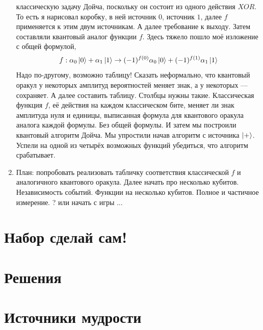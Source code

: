 \documentclass[12pt]{article}
\newcounter{problem}[section]
\theoremstyle{definition}
\begin{document}
\begin{enumerate}
  классическую задачу Дойча, поскольку он состоит из одного действия $XOR$. То есть
  я нарисовал коробку, в ней источник $0$, источник $1$, далее $f$ применяется к
  этим двум источникам. А далее требование к выходу. Затем составляли квантовый
  аналог функции $f$. Здесь тяжело пошло моё изложение с общей формулой,
  \[
   f : \alpha_0 \ket{0} + \alpha_1 \ket{1} \to
   (-1)^{f(0)}\alpha_0 \ket{0} + (-1)^{f(1)}\alpha_1 \ket{1}
  \]
  Надо по-другому, возможно таблицу! Сказать неформально, что квантовый оракул
  у некоторых амплитуд вероятностей меняет знак, а у некоторых — сохраняет.
  А далее составить таблицу. Столбцы нужны такие. Классическая функция $f$,
  её действия на каждом классическом бите, меняет ли знак амплитуда нуля и единицы,
  выписанная формула для квантового оракула аналога каждой формулы.
  Без общей формулы. И затем мы построили
  квантовый алгоритм Дойча. Мы упростили начав алгоритм с источника $\ket{+}$.
  Успели на одной из четырёх возможных функций убедиться, что алгоритм срабатывает.
  \item План: попробовать реализовать табличку соответствия классической $f$ и
  аналогичного квантового оракула. Далее начать про несколько кубитов. Независимость
  событий. Функции на несколько кубитов. Полное и частичное измерение. ? или начать с игры ...
\end{enumerate}




\renewenvironment{solution}[1]{%
         \vskip .5cm plus 2cm minus 0.1cm%
         {\bfseries \hyperlink{problem:#1}{#1.}}%
}%
{%
}%

\section{Набор сделай сам!}

\cite{stay2014deutch}

\section{Решения}



\section{Источники мудрости}
\printbibliography[heading=none]
\end{document}
